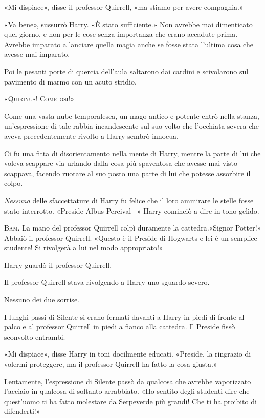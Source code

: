 «Mi dispiace», disse il professor Quirrell, «ma stiamo per avere compagnia.»

«Va bene», sussurrò Harry. «È stato sufficiente.» Non avrebbe mai dimenticato quel giorno, e non per le cose senza importanza che erano accadute prima. Avrebbe imparato a lanciare quella magia anche se fosse stata l’ultima cosa che avesse mai imparato.

Poi le pesanti porte di quercia dell’aula saltarono dai cardini e scivolarono sul pavimento di marmo con un acuto stridio.

«\textsc{Quirinus! Come osi!}»

Come una vasta nube temporalesca, un mago antico e potente entrò nella stanza, un’espressione di tale rabbia incandescente sul suo volto che l’occhiata severa che aveva precedentemente rivolto a Harry sembrò innocua.

Ci fu una fitta di disorientamento nella mente di Harry, mentre la parte di lui che voleva scappare via urlando dalla cosa più spaventosa che avesse mai visto scappava, facendo ruotare al suo posto una parte di lui che potesse assorbire il colpo.

\textit{Nessuna} delle sfaccettature di Harry fu felice che il loro ammirare le stelle fosse stato interrotto. «Preside Albus Percival –» Harry cominciò a dire in tono gelido.

\textsc{Bam}. La mano del professor Quirrell colpì duramente la cattedra.«Signor Potter!» Abbaiò il professor Quirrell. «Questo è il Preside di Hogwarts e lei è un semplice studente! Si rivolgerà a lui nel modo appropriato!»

Harry guardò il professor Quirrell.

Il professor Quirrell stava rivolgendo a Harry uno sguardo severo.

Nessuno dei due sorrise.

I lunghi passi di Silente si erano fermati davanti a Harry in piedi di fronte al palco e al professor Quirrell in piedi a fianco alla cattedra. Il Preside fissò sconvolto entrambi.

«Mi dispiace», disse Harry in toni docilmente educati. «Preside, la ringrazio di volermi proteggere, ma il professor Quirrell ha fatto la cosa giusta.»

Lentamente, l’espressione di Silente passò da qualcosa che avrebbe vaporizzato l’acciaio in qualcosa di soltanto arrabbiato. «Ho sentito degli studenti dire che quest’uomo ti ha fatto molestare da Serpeverde più grandi! Che ti ha proibito di difenderti!»

